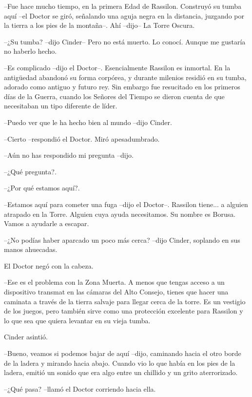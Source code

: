 --Fue hace mucho tiempo, en la primera Edad de Rassilon. Construyó su tumba aquí --el Doctor se giró, señalando una aguja negra en la distancia, juzgando por la tierra a los pies de la montaña--. Ahí --dijo-- La Torre Oscura.

--¿Su tumba? --dijo Cinder-- Pero no está muerto. Lo conocí. Aunque me gustaría no haberlo hecho.

--Es complicado --dijo el Doctor--. Esencialmente Rassilon es inmortal. En la antigüedad abandonó su forma corpórea, y durante milenios residió en su tumba, adorado como antiguo y futuro rey. Sin embargo fue resucitado en los primeros días de la Guerra, cuando los Señores del Tiempo se dieron cuenta de que necesitaban un tipo diferente de líder.

--Puedo ver que le ha hecho bien al mundo --dijo Cinder.

--Cierto --respondió el Doctor. Miró apesadumbrado.

--Aún no has respondido mi pregunta --dijo.

--¿Qué pregunta?.

--¿Por qué estamos aquí?.

--Estamos aquí para cometer una fuga --dijo el Doctor--. Rassilon tiene... a alguien atrapado en la Torre. Alguien cuya ayuda necesitamos. Su nombre es Borusa. Vamos a ayudarle a escapar.

--¿No podías haber aparcado un poco más cerca? --dijo Cinder, soplando en sus manos ahuecadas.



El Doctor negó con la cabeza. 



--Ese es el problema con la Zona Muerta. A menos que tengas acceso a un dispositivo transmat en las cámaras del Alto Consejo, tienes que hacer una caminata a través de la tierra salvaje para llegar cerca de la torre. Es un vestigio de los juegos, pero también sirve como una protección excelente para Rassilon y lo que sea que quiera levantar en su vieja tumba.



Cinder asintió. 



--Bueno, veamos si podemos bajar de aquí --dijo, caminando hacia el otro borde de la ladera y mirando hacia abajo. Cuando vio lo que había en los pies de la ladera, emitió un sonido que era algo entre un chillido y un grito aterrorizado.

--¿Qué pasa? --llamó el Doctor corriendo hacia ella.

